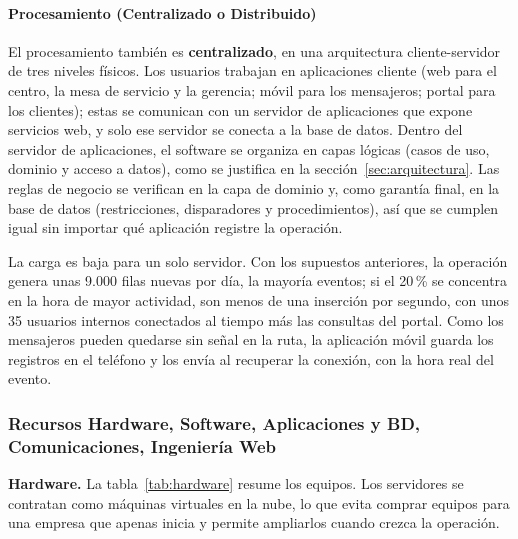 \paragraph{Procesamiento (Centralizado o Distribuido)}

El procesamiento también es \textbf{centralizado}, en una arquitectura
cliente-servidor de tres niveles físicos. Los usuarios trabajan en
aplicaciones cliente (web para el centro, la mesa de servicio y la
gerencia; móvil para los mensajeros; portal para los clientes); estas
se comunican con un servidor de aplicaciones que expone servicios web,
y solo ese servidor se conecta a la base de datos. Dentro del servidor
de aplicaciones, el software se organiza en capas lógicas (casos de
uso, dominio y acceso a datos), como se justifica en la
sección~\ref{sec:arquitectura}. Las reglas de negocio se verifican en
la capa de dominio y, como garantía final, en la base de datos
(restricciones, disparadores y procedimientos), así que se cumplen
igual sin importar qué aplicación registre la operación.

La carga es baja para un solo servidor. Con los supuestos anteriores,
la operación genera unas 9.000 filas nuevas por día, la mayoría
eventos; si el 20\,\% se concentra en la hora de mayor actividad, son
menos de una inserción por segundo, con unos 35 usuarios internos
conectados al tiempo más las consultas del portal. Como los mensajeros
pueden quedarse sin señal en la ruta, la aplicación móvil guarda los
registros en el teléfono y los envía al recuperar la conexión, con la
hora real del evento.

\subsubsection{Recursos Hardware, Software, Aplicaciones y BD, Comunicaciones, Ingeniería Web}

\textbf{Hardware.} La tabla~\ref{tab:hardware} resume los equipos. Los
servidores se contratan como máquinas virtuales en la nube, lo que evita
comprar equipos para una empresa que apenas inicia y permite ampliarlos
cuando crezca la operación.

